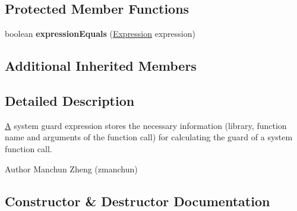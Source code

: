 \subsection*{Protected Member Functions}
\begin{DoxyCompactItemize}
\item 
\hypertarget{classedu_1_1udel_1_1cis_1_1vsl_1_1civl_1_1model_1_1common_1_1expression_1_1CommonSystemGuardExpression_abfd147430d22e2a0f658aa5942b4f42a}{}boolean {\bfseries expression\+Equals} (\hyperlink{interfaceedu_1_1udel_1_1cis_1_1vsl_1_1civl_1_1model_1_1IF_1_1expression_1_1Expression}{Expression} expression)\label{classedu_1_1udel_1_1cis_1_1vsl_1_1civl_1_1model_1_1common_1_1expression_1_1CommonSystemGuardExpression_abfd147430d22e2a0f658aa5942b4f42a}

\end{DoxyCompactItemize}
\subsection*{Additional Inherited Members}


\subsection{Detailed Description}
\hyperlink{structA}{A} system guard expression stores the necessary information (library, function name and arguments of the function call) for calculating the guard of a system function call. 

\begin{DoxyAuthor}{Author}
Manchun Zheng (zmanchun) 
\end{DoxyAuthor}


\subsection{Constructor \& Destructor Documentation}
\hypertarget{classedu_1_1udel_1_1cis_1_1vsl_1_1civl_1_1model_1_1common_1_1expression_1_1CommonSystemGuardExpression_a4513fd6125801e577cbc9380c3c28305}{}
